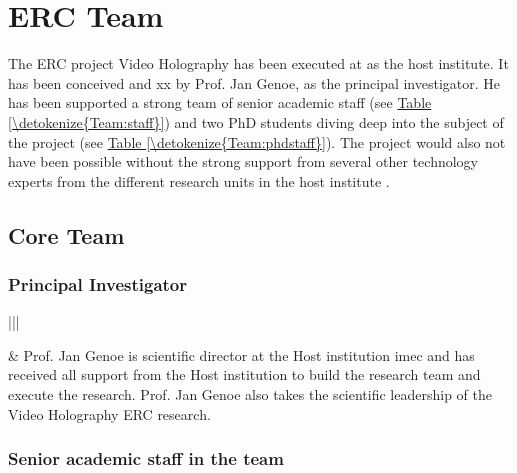 \documentclass[a4paper,10pt,english,openany,oneside]{jupyterBook}
\begin{document}
\chapter{ERC Team}
\label{\detokenize{Team:erc-team}}\label{\detokenize{Team::doc}}
\sphinxAtStartPar
The ERC project Video Holography has been executed at  as the host institute. It has been conceived and xx by Prof. Jan Genoe, as the principal investigator. He has been supported a strong team of senior academic staff (see \hyperref[\detokenize{Team:staff}]{Table \ref{\detokenize{Team:staff}}}) and two PhD students diving deep into the subject of the project (see \hyperref[\detokenize{Team:phdstaff}]{Table \ref{\detokenize{Team:phdstaff}}}). The project would also not have been possible without the strong support from several other technology experts from the different research units in the host institute .


\section{Core Team}
\label{\detokenize{Team:core-team}}

\subsection{Principal Investigator}
\label{\detokenize{Team:principal-investigator}}

\begin{savenotes}\sphinxattablestart
\centering
\begin{tabular}[t]{|||}
\hline

\sphinxAtStartPar
{}
&
\sphinxAtStartPar
Prof. Jan Genoe is scientific director at the Host institution imec and has received all support from the Host institution to build the research team and execute the research. Prof. Jan Genoe also takes the scientific leadership of the Video Holography ERC research.
\\
\hline
\end{tabular}
\par
\sphinxattableend\end{savenotes}


\subsection{Senior academic staff in the team}
\label{\detokenize{Team:senior-academic-staff-in-the-team}}
\end{document}
